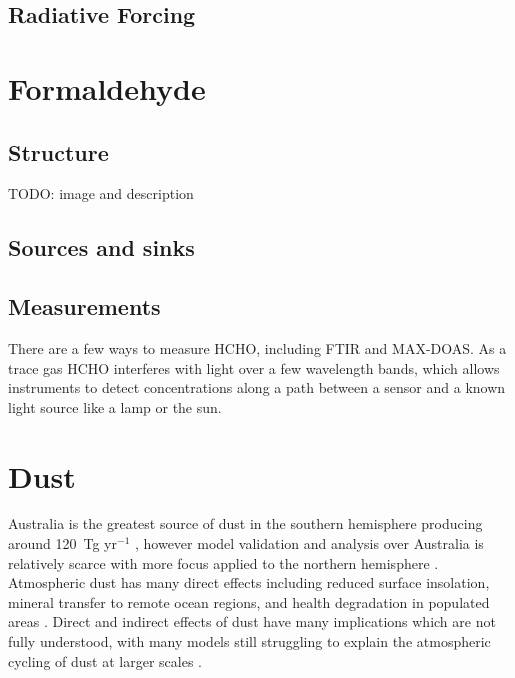   \subsection{Radiative Forcing}

  
\section{Formaldehyde}
\label{ch1:sec:formaldehyde}
  
  \subsection{Structure}
  TODO: image and description
  
  \subsection{Sources and sinks}
    
    
  \subsection{Measurements}
    There are a few ways to measure HCHO, including FTIR and MAX-DOAS. As a trace gas HCHO interferes with light over a few wavelength bands, which allows instruments to detect concentrations along a path between a sensor and a known light source like a lamp or the sun.
  
\section{Dust}
\label{ch1:sec:dust}

  Australia is the greatest source of dust in the southern hemisphere producing around 120~Tg yr$^{-1}$ \citep{Li_2008}, however model validation and analysis over Australia is relatively scarce with more focus applied to the northern hemisphere \citep{Duncan_Fairlie_2007,Ridley_2013}.
  Atmospheric dust has many direct effects including reduced surface insolation, mineral transfer to remote ocean regions, and health degradation in populated areas \citep{Shao_2007}.
  Direct and indirect effects of dust have many implications which are not fully understood, with many models still struggling to explain the atmospheric cycling of dust at larger scales \citep{Rotstayn_2011}.

